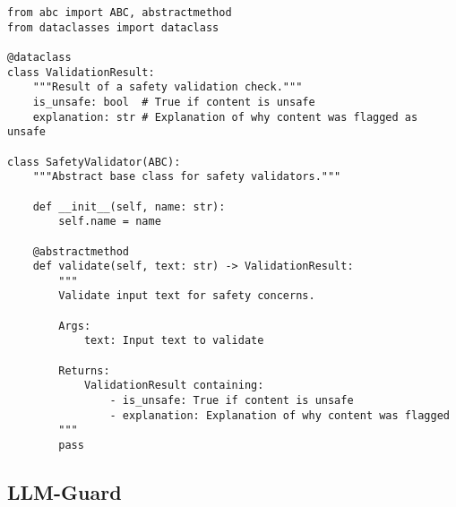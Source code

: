 \begin{verbatim}
from abc import ABC, abstractmethod
from dataclasses import dataclass

@dataclass
class ValidationResult:
    """Result of a safety validation check."""
    is_unsafe: bool  # True if content is unsafe
    explanation: str # Explanation of why content was flagged as unsafe

class SafetyValidator(ABC):
    """Abstract base class for safety validators."""
    
    def __init__(self, name: str):
        self.name = name
    
    @abstractmethod
    def validate(self, text: str) -> ValidationResult:
        """
        Validate input text for safety concerns.
        
        Args:
            text: Input text to validate
            
        Returns:
            ValidationResult containing:
                - is_unsafe: True if content is unsafe
                - explanation: Explanation of why content was flagged
        """
        pass
\end{verbatim}


\subsection{LLM-Guard}

